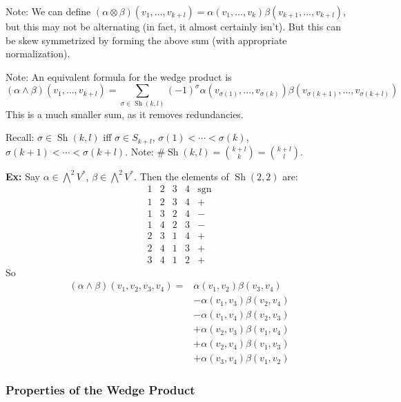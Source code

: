 \documentclass[10pt,letterpaper]{article}
\newcommand{\n}{\hfill\break}
\newcommand{\hangblock}[2]{\par\noindent\settowidth{\hangindent}{\textbf{#1: }}\textbf{#1: }\nolinebreak#2}
\newcommand{\ex}[1]{\hangblock{Ex}{#1}}
\DeclareMathOperator{\sgn}{sgn}
\DeclareMathOperator{\Sh}{Sh}
\begin{document}
\par\noindent
Note: We can define $(\alpha\otimes\beta)(v_{1},\ldots,v_{k+l})=\alpha(v_{1},\ldots,v_{k})\beta(v_{k+1},\ldots,v_{k+l})$, but this may not be alternating (in fact, it almost certainly isn't). But this can be skew symmetrized by forming the above sum (with appropriate normalization).\n

\par\noindent
Note: An equivalent formula for the wedge product is
\[
	(\alpha\wedge\beta)(v_{1},\ldots,v_{k+l})=\sum_{\sigma\in\Sh(k,l)}(-1)^{\sigma}\alpha(v_{\sigma(1)},\ldots,v_{\sigma(k)})\beta(v_{\sigma(k+1)},\ldots,v_{\sigma(k+l)})
\]
This is a much smaller sum, as it removes redundancies.\n

\par\noindent
Recall: $\sigma\in\Sh(k,l)$ iff $\sigma\in{}S_{k+l}$, $\sigma(1)<\cdots<\sigma(k)$, $\sigma(k+1)<\cdots<\sigma(k+l)$.\n
Note: $\#\Sh(k,l)=\binom{k+l}{k}=\binom{k+l}{l}$.\n

\ex{
	Say $\alpha\in\bigwedge^{2}V^{*}$, $\beta\in\bigwedge^{2}V^{*}$. Then the elements of $\Sh(2,2)$ are:
	\[
		\begin{array}{cc|cc|c}
			1 & 2 & 3 & 4 & \sgn\\ \hline
			1 & 2 & 3 & 4 & +\\
			1 & 3 & 2 & 4 & -\\
			1 & 4 & 2 & 3 & -\\
			2 & 3 & 1 & 4 & +\\
			2 & 4 & 1 & 3 & +\\
			3 & 4 & 1 & 2 & +
		\end{array}
	\]
	So
	\begin{align*}
		(\alpha\wedge\beta)(v_{1},v_{2},v_{3},v_{4})={} & \alpha(v_{1},v_{2})\beta(v_{3},v_{4})\\
		& -\alpha(v_{1},v_{3})\beta(v_{2},v_{4})\\
		& -\alpha(v_{1},v_{4})\beta(v_{2},v_{3})\\
		& +\alpha(v_{2},v_{3})\beta(v_{1},v_{4})\\
		& +\alpha(v_{2},v_{4})\beta(v_{1},v_{3})\\
		& +\alpha(v_{3},v_{4})\beta(v_{1},v_{2})
	\end{align*}
}

\subsubsection*{Properties of the Wedge Product}
\end{document}

